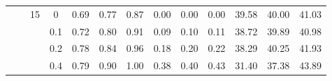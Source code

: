 \documentclass[11pt]{beamer}
\begin{document}
\begin{frame}
\begin{table}[h!]
{\begin{tabular}{cccc|ccc@{\hskip 0.2in}ccc@{\hskip 0.2in}ccc}
          &       & 15           & 0     & 0.69   & 0.77    & 0.87  & 0.00  & 0.00 & 0.00 & 39.58 & 40.00 & 41.03  \\
          &       &              & 0.1   & 0.72   & 0.80    & 0.91  & 0.09  & 0.10 & 0.11 & 38.72 & 39.89 & 40.98  \\
          &       &              & 0.2   & 0.78   & 0.84    & 0.96  & 0.18  & 0.20 & 0.22 & 38.29 & 40.25 & 41.93  \\
          &       &              & 0.4   & 0.79   & 0.90    & 1.00  & 0.38  & 0.40 & 0.43 & 31.40 & 37.38 & 43.89 
\end{tabular}
}
\end{table}

\end{frame}

\begin{frame}


\begin{table}[h!]
{\tiny
\centering

}
\end{table}
\end{frame}
\end{document}
